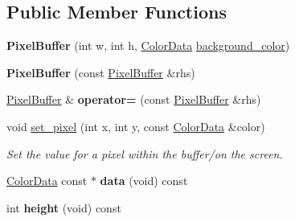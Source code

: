 \subsection*{Public Member Functions}
\begin{DoxyCompactItemize}
\item 
{\bfseries Pixel\+Buffer} (int w, int h, \hyperlink{classimage__tools_1_1ColorData}{Color\+Data} \hyperlink{classimage__tools_1_1PixelBuffer_a56ac2b6b21368d04a71d6a615eebdd33}{background\+\_\+color})\hypertarget{classimage__tools_1_1PixelBuffer_a4f5b5df93389946d70bc001acfebcedb}{}\label{classimage__tools_1_1PixelBuffer_a4f5b5df93389946d70bc001acfebcedb}

\item 
{\bfseries Pixel\+Buffer} (const \hyperlink{classimage__tools_1_1PixelBuffer}{Pixel\+Buffer} \&rhs)\hypertarget{classimage__tools_1_1PixelBuffer_a25b0c7d5686807d187ee799a5fbb1121}{}\label{classimage__tools_1_1PixelBuffer_a25b0c7d5686807d187ee799a5fbb1121}

\item 
\hyperlink{classimage__tools_1_1PixelBuffer}{Pixel\+Buffer} \& {\bfseries operator=} (const \hyperlink{classimage__tools_1_1PixelBuffer}{Pixel\+Buffer} \&rhs)\hypertarget{classimage__tools_1_1PixelBuffer_a95f63d0b72c4d0b371c556597cf77578}{}\label{classimage__tools_1_1PixelBuffer_a95f63d0b72c4d0b371c556597cf77578}

\item 
void \hyperlink{classimage__tools_1_1PixelBuffer_ac3559133504c49f3af9a00544411c3b8}{set\+\_\+pixel} (int x, int y, const \hyperlink{classimage__tools_1_1ColorData}{Color\+Data} \&color)\hypertarget{classimage__tools_1_1PixelBuffer_ac3559133504c49f3af9a00544411c3b8}{}\label{classimage__tools_1_1PixelBuffer_ac3559133504c49f3af9a00544411c3b8}

\begin{DoxyCompactList}\small\item\em Set the value for a pixel within the buffer/on the screen. \end{DoxyCompactList}\item 
\hyperlink{classimage__tools_1_1ColorData}{Color\+Data} const $\ast$ {\bfseries data} (void) const \hypertarget{classimage__tools_1_1PixelBuffer_a2450a6c464bbe620d9efec2ac6c82a9e}{}\label{classimage__tools_1_1PixelBuffer_a2450a6c464bbe620d9efec2ac6c82a9e}

\item 
int {\bfseries height} (void) const \hypertarget{classimage__tools_1_1PixelBuffer_a37fa2f4abc4c1d28a063c3c74b1faf9d}{}\label{classimage__tools_1_1PixelBuffer_a37fa2f4abc4c1d28a063c3c74b1faf9d}


\end{DoxyCompactItemize}
